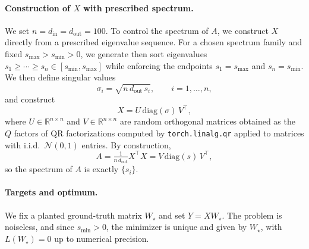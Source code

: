 \documentclass{article}
\theoremstyle{plain}
\theoremstyle{definition}
\theoremstyle{remark}
\newcommand{\R}{\mathbb{R}}
\newcommand{\loss}{L}
\begin{document}
\paragraph{Construction of $X$ with prescribed spectrum.}
We set $n=d_{\mathrm{in}}=d_{\mathrm{out}}=100$.
To control the spectrum of $A$, we construct $X$ directly from a prescribed
eigenvalue sequence.
For a chosen spectrum family and fixed $s_{\max} > s_{\min} > 0$, we generate then sort eigenvalues
$s_1\ge \cdots \ge s_n \in [s_{\min},s_{\max}]$ while enforcing the endpoints
$s_1=s_{\max}$ and $s_n=s_{\min}$.
We then define singular values
\[
\sigma_i = \sqrt{n\,d_{\mathrm{out}}\, s_i}, \qquad i=1,\dots,n,
\]
and construct
\[
X = U\,\mathrm{diag}(\sigma)\,V^\top,
\]
where $U\in\R^{n\times n}$ and $V\in\R^{n\times n}$ are random orthogonal matrices
obtained as the $Q$ factors of QR factorizations computed by \texttt{torch.linalg.qr}
applied to matrices with i.i.d.\ $\mathcal N(0,1)$ entries. 
By construction,
\[
A = \tfrac{1}{n\,d_{\mathrm{out}}} X^\top X
= V\,\mathrm{diag}(s)\,V^\top ,
\]
so the spectrum of $A$ is exactly $\{s_i\}$.

\paragraph{Targets and optimum.}
We fix a planted ground-truth matrix $W_\star$ and set $Y = X W_\star$.
The problem is noiseless, and since $s_{\min}>0$,
the minimizer is unique and given by $W_\star$,
with $\loss(W_\star)=0$ up to numerical precision.
\end{document}
